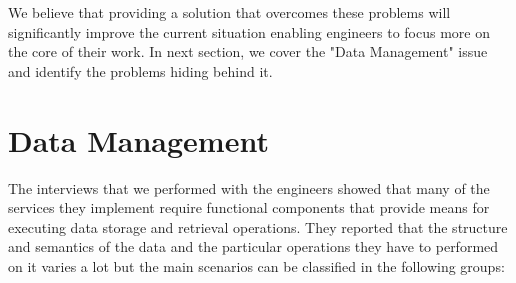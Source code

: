 We believe that providing a solution that overcomes these problems will significantly improve the current situation enabling engineers to focus more on the core of their work. In next section, we cover the "Data Management" issue and identify the problems hiding behind it.


\section{Data Management}
\label{sec:problemDefStorage}

The interviews that we performed with the engineers showed that many of the services they implement require functional components that provide means for executing data storage and retrieval operations. They reported that the structure and semantics of the data and the particular operations they have to performed on it varies a lot but the main scenarios can be classified in the following groups:

